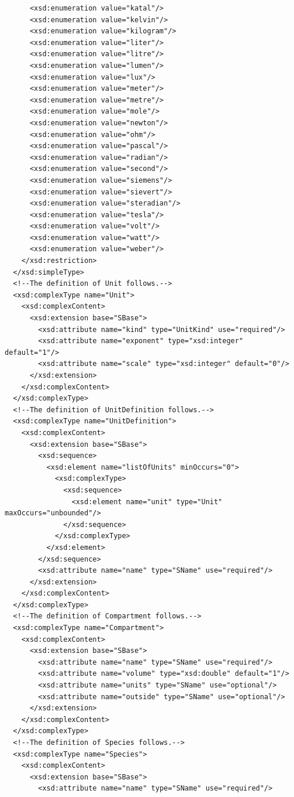 \documentclass[10pt]{cekarticle}
\begin{document}
\begin{small}
\begin{verbatim}
      <xsd:enumeration value="katal"/>
      <xsd:enumeration value="kelvin"/>
      <xsd:enumeration value="kilogram"/>
      <xsd:enumeration value="liter"/>
      <xsd:enumeration value="litre"/>
      <xsd:enumeration value="lumen"/>
      <xsd:enumeration value="lux"/>
      <xsd:enumeration value="meter"/>
      <xsd:enumeration value="metre"/>
      <xsd:enumeration value="mole"/>
      <xsd:enumeration value="newton"/>
      <xsd:enumeration value="ohm"/>
      <xsd:enumeration value="pascal"/>
      <xsd:enumeration value="radian"/>
      <xsd:enumeration value="second"/>
      <xsd:enumeration value="siemens"/>
      <xsd:enumeration value="sievert"/>
      <xsd:enumeration value="steradian"/>
      <xsd:enumeration value="tesla"/>
      <xsd:enumeration value="volt"/>
      <xsd:enumeration value="watt"/>
      <xsd:enumeration value="weber"/>
    </xsd:restriction>
  </xsd:simpleType>
  <!--The definition of Unit follows.-->
  <xsd:complexType name="Unit">
    <xsd:complexContent>
      <xsd:extension base="SBase">
        <xsd:attribute name="kind" type="UnitKind" use="required"/>
        <xsd:attribute name="exponent" type="xsd:integer" default="1"/>
        <xsd:attribute name="scale" type="xsd:integer" default="0"/>
      </xsd:extension>
    </xsd:complexContent>
  </xsd:complexType>
  <!--The definition of UnitDefinition follows.-->
  <xsd:complexType name="UnitDefinition">
    <xsd:complexContent>
      <xsd:extension base="SBase">
        <xsd:sequence>
          <xsd:element name="listOfUnits" minOccurs="0">
            <xsd:complexType>
              <xsd:sequence>
                <xsd:element name="unit" type="Unit" maxOccurs="unbounded"/>
              </xsd:sequence>
            </xsd:complexType>
          </xsd:element>
        </xsd:sequence>
        <xsd:attribute name="name" type="SName" use="required"/>
      </xsd:extension>
    </xsd:complexContent>
  </xsd:complexType>
  <!--The definition of Compartment follows.-->
  <xsd:complexType name="Compartment">
    <xsd:complexContent>
      <xsd:extension base="SBase">
        <xsd:attribute name="name" type="SName" use="required"/>
        <xsd:attribute name="volume" type="xsd:double" default="1"/>
        <xsd:attribute name="units" type="SName" use="optional"/>
        <xsd:attribute name="outside" type="SName" use="optional"/>
      </xsd:extension>
    </xsd:complexContent>
  </xsd:complexType>
  <!--The definition of Species follows.-->
  <xsd:complexType name="Species">
    <xsd:complexContent>
      <xsd:extension base="SBase">
        <xsd:attribute name="name" type="SName" use="required"/>

\end{verbatim}
\end{small}
\end{document}
